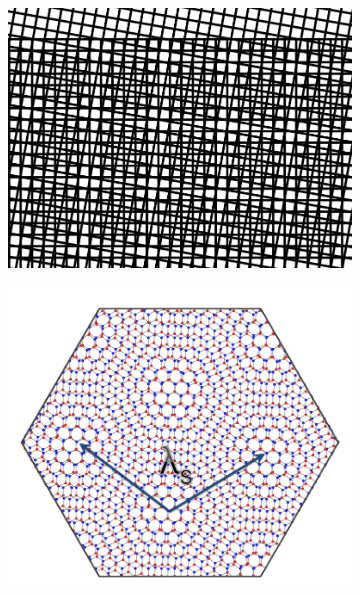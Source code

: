 \documentclass[hyperref, a4paper]{article}
\begin{document}
\begin{figure}
    \centering
    \begin{subfigure}{0.2\textwidth}
        \centering
        \includegraphics[width=\textwidth]{structure/moire-square.png}
        \subcaption{}
        \label{fig:square-moire}
    \end{subfigure}    
    \begin{subfigure}{0.3\textwidth}
        \centering
        \includegraphics[width=\textwidth]{structure/moire-graphene.PNG}
        \subcaption{}
        \label{fig:hexagonal-moire}
    \end{subfigure}

\end{figure}
\end{document}
